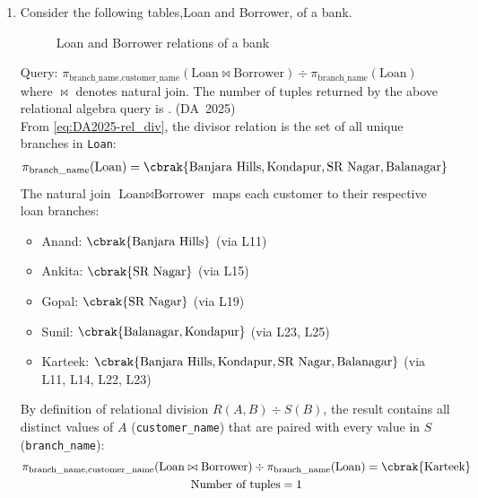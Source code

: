 \begin{enumerate}[label=\thesubsection.\arabic*, ref=\thesubsection.\theenumi]
\item 
Consider the  following tables,Loan and Borrower, of a bank.
\begin{figure}[H]
	\centering
	\begin{minipage}[t]{0.48\textwidth}
		\centering
		
	\end{minipage}\hfill
	\begin{minipage}[t]{0.48\textwidth}
		\centering
		
	\end{minipage}
	\caption{Loan and Borrower relations of a bank}
	\label{fig:loan_borrower}
\end{figure}
Query: $\pi_{\text{branch\_name}, \text{customer\_name}}(\text{Loan} \bowtie \text{Borrower}) \div \pi_{\text{branch\_name}}(\text{Loan})$ where $\bowtie$ denotes natural join. The number of tuples returned by the above relational algebra query is \underline{\hspace{1.5cm}}.
\hfill (DA~2025)
\\
\solution
From \eqref{eq:DA2025-rel_div}, the divisor relation is the set of all unique branches in \texttt{Loan}:
\begin{align}
	\pi_{\text{branch\_name}}(\text{Loan}) &= \cbrak{\text{Banjara Hills}, \text{Kondapur}, \text{SR Nagar}, \text{Balanagar}}
\end{align}
The natural join $\text{Loan} \bowtie \text{Borrower}$ maps each customer to their respective loan branches:
\begin{itemize}
	\item Anand: $\cbrak{\text{Banjara Hills}}$ (via L11)
	\item Ankita: $\cbrak{\text{SR Nagar}}$ (via L15)
	\item Gopal: $\cbrak{\text{SR Nagar}}$ (via L19)
	\item Sunil: $\cbrak{\text{Balanagar}, \text{Kondapur}}$ (via L23, L25)
	\item Karteek: $\cbrak{\text{Banjara Hills}, \text{Kondapur}, \text{SR Nagar}, \text{Balanagar}}$ (via L11, L14, L22, L23)
\end{itemize}
By definition of relational division $R(A, B) \div S(B)$, the result contains all distinct values of $A$ (\texttt{customer\_name}) that are paired with every value in $S$ (\texttt{branch\_name}):
\begin{gather}
	\pi_{\text{branch\_name}, \text{customer\_name}}(\text{Loan} \bowtie \text{Borrower}) \div \pi_{\text{branch\_name}}(\text{Loan}) = \cbrak{\text{Karteek}}
	\\
	\text{Number of tuples} = 1
\end{gather}


\end{enumerate}
